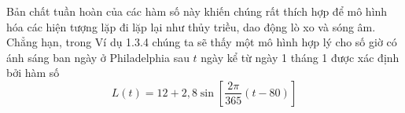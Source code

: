 \begin{minipage}[t]{0.708\textwidth}
    Bản chất tuần hoàn của các hàm số này khiến chúng rất thích hợp để mô hình hóa các hiện tượng lặp đi lặp lại như thủy triều, dao động lò xo và sóng âm. Chẳng hạn, trong Ví dụ 1.3.4 chúng ta sẽ thấy một mô hình hợp lý cho số giờ có ánh sáng ban ngày ở Philadelphia sau $t$ ngày kể từ ngày 1 tháng 1 được xác định bởi hàm số
    \begin{equation*}
    L(t) = 12 + 2{,}8 \sin\left[ \frac{2\pi}{365}(t - 80) \right]
    \end{equation*}
\end{minipage}